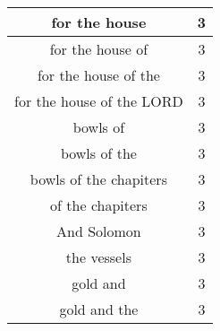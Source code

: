 \begin{center}
\begin{longtable}{|c|c|}
for the house & 3\\ \hline 
for the house of & 3\\ \hline 
for the house of the & 3\\ \hline 
for the house of the LORD & 3\\ \hline 
bowls of & 3\\ \hline 
bowls of the & 3\\ \hline 
bowls of the chapiters & 3\\ \hline 
of the chapiters & 3\\ \hline 
And Solomon & 3\\ \hline 
the vessels & 3\\ \hline 
gold and & 3\\ \hline 
gold and the & 3\\ \hline 
\end{longtable}
\end{center}





